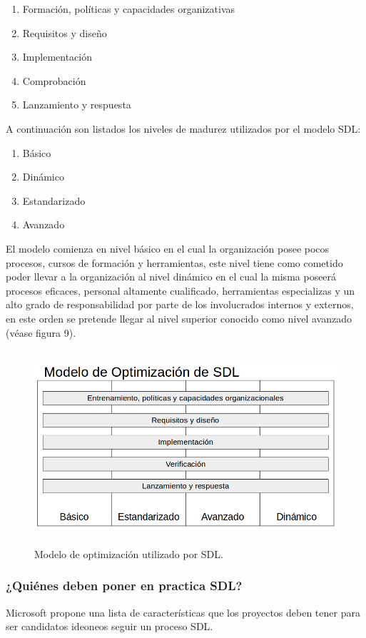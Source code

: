 \documentclass[runningheads,a4paper]{llncs}
\begin{document}
\begin{enumerate}
	\item Formación, políticas y capacidades organizativas 
	\item Requisitos y diseño 
	\item Implementación 
	\item Comprobación 
	\item Lanzamiento y respuesta 
\end{enumerate}

A continuación son listados los niveles de madurez utilizados por el modelo \gls{SDL}:

\begin{enumerate}
\item Básico 
\item Dinámico 
\item Estandarizado 
\item Avanzado 
\end{enumerate}

El modelo comienza en nivel básico en el cual la organización posee pocos procesos, cursos de formación y herramientas, este nivel tiene como cometido poder llevar a la organización al nivel dinámico en el cual la misma poseerá procesos eficaces, personal altamente cualificado, herramientas especializas y un alto grado de responsabilidad por parte de los involucrados internos y externos, en este orden se pretende llegar al nivel superior conocido como nivel avanzado (véase figura 9). \\

\begin{figure}
\centering
\includegraphics[height=7.2cm, width=12.0cm]{sa_figura_9}
\caption{Modelo de optimización utilizado por \gls{SDL}.}
\label{fig:example}
\end{figure}


\subsubsection{¿Quiénes deben poner en practica \gls{SDL}?}
Microsoft propone una lista de características que los proyectos deben tener para ser candidatos ideoneos seguir un proceso \gls{SDL}.
\end{document}
